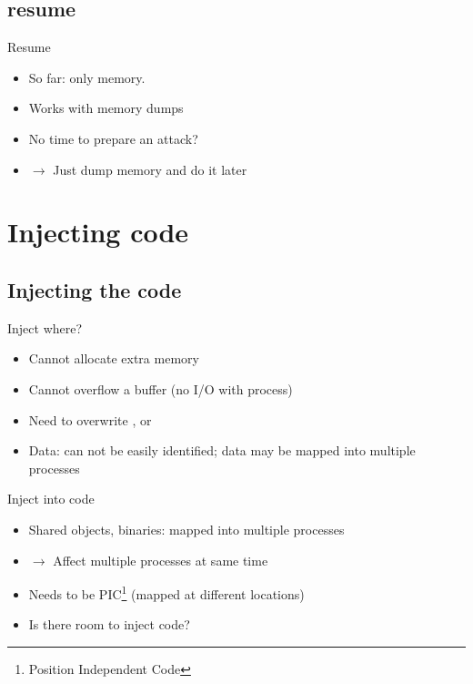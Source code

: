 \documentclass{beamer}
\newenvironment{itemizeframe}[1]
  {\begin{frame}{#1}\startitemizeframe}
  {\stopitemizeframe\end{frame}}
\newcommand\startitemizeframe{\begin{itemize}}
\newcommand\stopitemizeframe{\end{itemize}}
\begin{document}
	\subsection{resume}

		\begin{itemizeframe}{Resume}
			\item So far: only  memory.
			\item Works with memory dumps
			\item No time to prepare an attack?
			\item $\rightarrow$ Just dump memory and do it later
		\end{itemizeframe}

\section{Injecting code}


	\subsection{Injecting the code}

		\begin{itemizeframe}{Inject where?}
			\item Cannot allocate extra memory
			\item Cannot overflow a buffer (no I/O with process)
			\item Need to overwrite ,  or 
			\item Data: can not be easily identified; data may be mapped into multiple processes
		\end{itemizeframe}
			
		\begin{itemizeframe}{Inject into code}
			\item Shared objects, binaries: mapped into multiple processes
			\item $\rightarrow$ Affect multiple processes at same time
			\item Needs to be PIC\footnote{Position Independent Code} (mapped at different locations)
			\item Is there room to inject code?
		\end{itemizeframe}
\end{document}
